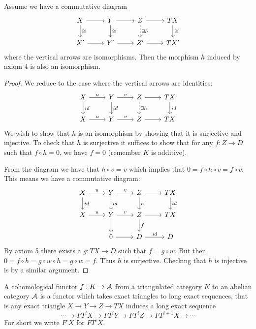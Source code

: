 \documentclass[a4paper, UKenglish]{report}
\begin{document}
\begin{proposition}[5-lemma]
Assume we have a commutative diagram
\[
\begin{tikzcd}
X \ar{d}{\cong} \ar{r} & Y \ar{d}{\cong} \ar{r} & Z \arrow[dashed]{d}{ \exists h} \ar{r} & \ar{d}{\cong} TX \\
X' \ar{r} & Y' \ar{r} & Z' \ar{r} & TX' 
\end{tikzcd} 
\]
where the vertical arrows are isomorphisms. Then  the morphism $h$ induced by axiom 4 is also an isomorphism.
\end{proposition}
\begin{proof}
We reduce to the case where the vertical arrows are identities:
\[
\begin{tikzcd}
X \ar{d}{id} \ar{r}{u} & Y \ar{d}{id} \ar{r}{v} & Z \arrow[dashed]{d}{ \exists h} \ar{r} & \ar{d}{id} TX \\
X \ar{r}{u} & Y \ar{r}{v} & Z \ar{r} & TX 
\end{tikzcd} 
\]
We wish to show that $h$ is an isomorphism by showing that it is surjective and injective. To check that $h$ is surjective it suffices to show that for any $f: Z \to D$ such that $f \circ h = 0$, we have $f=0$ (remember $K$ is additive).

From the diagram we have that $h \circ v=v$ which implies that $0=f \circ h \circ v=f \circ v$. This means we have a commutative diagram:
\[
\begin{tikzcd}
X \ar{d}{id} \ar{r}{u} & Y \ar{d}{id} \ar{r}{v} & Z \arrow{d}{ h} \ar{r} & \ar{d}{id} TX \\
X \ar{r}{u} & Y \ar{r}{v} \ar{d} & Z \ar{r} \ar{d}{f} & TX \\
\text{ } & 0 \ar{r} & D \ar{r}{id} & D
\end{tikzcd} 
\]
By axiom 5 there exists a $g: TX \to D$ such that $f= g \circ w$. But then $0=f \circ h = g \circ w \circ h = g \circ w = f$. Thus $h$ is surjective. Checking that $h$ is injective is by a similar argument.

\end{proof}

\begin{definition}
A cohomological functor $f:K \to \mathcal{A}$ from a triangulated category $K$ to an abelian category  $\mathcal{A}$  is a functor which takes exact triangles to long exact sequences, that is any exact triangle $X \to Y \to Z \to TX$ induces a long exact sequence
\[ \cdots \to FT^iX \to FT^iY \to FT^iZ \to FT^{i+1}X \to \cdots \]
For short we write $F^iX$ for $FT^iX$.
\end{definition}
\end{document}
